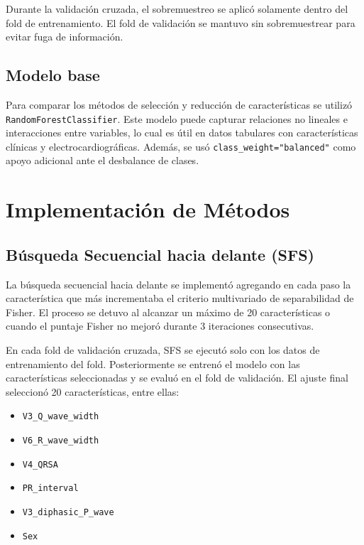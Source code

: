 \documentclass{article}
\begin{document}
Durante la validación cruzada, el sobremuestreo se aplicó solamente dentro del fold de entrenamiento. El fold de validación se mantuvo sin sobremuestrear para evitar fuga de información.

\subsection{Modelo base}

Para comparar los métodos de selección y reducción de características se utilizó \texttt{RandomForestClassifier}. Este modelo puede capturar relaciones no lineales e interacciones entre variables, lo cual es útil en datos tabulares con características clínicas y electrocardiográficas. Además, se usó \texttt{class\_weight="balanced"} como apoyo adicional ante el desbalance de clases.

\section{Implementación de Métodos}

\subsection{Búsqueda Secuencial hacia delante (SFS)}

La búsqueda secuencial hacia delante se implementó agregando en cada paso la característica que más incrementaba el criterio multivariado de separabilidad de Fisher. El proceso se detuvo al alcanzar un máximo de 20 características o cuando el puntaje Fisher no mejoró durante 3 iteraciones consecutivas.

En cada fold de validación cruzada, SFS se ejecutó solo con los datos de entrenamiento del fold. Posteriormente se entrenó el modelo con las características seleccionadas y se evaluó en el fold de validación. El ajuste final seleccionó 20 características, entre ellas:

\begin{itemize}
    \item \texttt{V3\_Q\_wave\_width}
    \item \texttt{V6\_R\_wave\_width}
    \item \texttt{V4\_QRSA}
    \item \texttt{PR\_interval}
    \item \texttt{V3\_diphasic\_P\_wave}
    \item \texttt{Sex}
\end{itemize}
\end{document}
